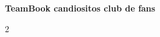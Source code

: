 \documentclass[10pt,landscape,letterpaper,notitlepage]{article}
\begin{document}
\thispagestyle{empty}

\begin{center}
    {\Large\textbf{TeamBook candiositos club de fans}}
\end{center}

\setcounter{tocdepth}{2}
\tableofcontents

\newpage
\setcounter{page}{1}

\begin{multicols*}{2}

\end{multicols*}
\end{document}
